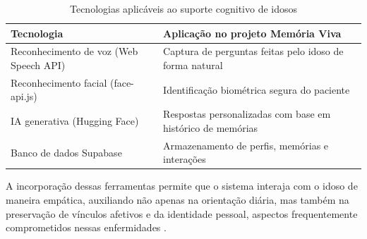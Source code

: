 \begin{table}[h]
\centering
\caption{Tecnologias aplicáveis ao suporte cognitivo de idosos}
\label{tab:tecnologias}
\begin{tabular}{|p{4cm}|p{7cm}|}
\hline
\textbf{Tecnologia} & \textbf{Aplicação no projeto Memória Viva} \\ \hline
Reconhecimento de voz (Web Speech API) & Captura de perguntas feitas pelo idoso de forma natural \\ \hline
Reconhecimento facial (face-api.js) & Identificação biométrica segura do paciente \\ \hline
IA generativa (Hugging Face) & Respostas personalizadas com base em histórico de memórias \\ \hline
Banco de dados Supabase & Armazenamento de perfis, memórias e interações \\ \hline
\end{tabular}
\end{table}

A incorporação dessas ferramentas permite que o sistema interaja com o idoso de maneira empática, auxiliando não apenas na orientação diária, mas também na preservação de vínculos afetivos e da identidade pessoal, aspectos frequentemente comprometidos nessas enfermidades \cite{assistiva2024}.
